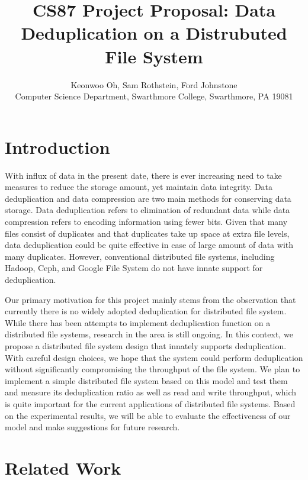 \documentclass[11pt]{article}
\begin{document}
\title{CS87 Project Proposal: Data Deduplication on a Distrubuted File System}

\author{Keonwoo Oh, Sam Rothstein, Ford Johnstone \\
Computer Science Department, Swarthmore College, Swarthmore, PA  19081}

\maketitle

\section {Introduction}\label{intro}

With influx of data in the present date, there is ever increasing need to take measures to reduce the storage amount, yet maintain data integrity. Data deduplication and data compression are two main methods for conserving data storage. Data deduplication refers to elimination of redundant data while data compression refers to encoding information using fewer bits\cite{Overview}. Given that many files consist of duplicates and that duplicates take up space at extra file levels, data deduplication could be quite effective in case of large amount of data with many duplicates\cite{Overview}. However, conventional distributed file systems, including Hadoop, Ceph, and Google File System do not have innate support for deduplication\cite{GFS}\cite{HDFS}.

Our primary motivation for this project mainly stems from the observation that currently there is no widely adopted deduplication for distributed file system. While there has been attempts to implement deduplication function on a distributed file systems, research in the area is still ongoing. In this context, we propose a distributed file system design that innately supports deduplication. With careful design choices, we hope that the system could perform deduplication without significantly compromising the throughput of the file system. We plan to implement a simple distributed file system based on this model and test them and measure its deduplication ratio as well as read and write throughput, which is quite important for the current applications of distributed file systems. Based on the experimental results, we will be able to evaluate the effectiveness of our model and make suggestions for future research.

\section {Related Work}\label{rel}
\end{document}
